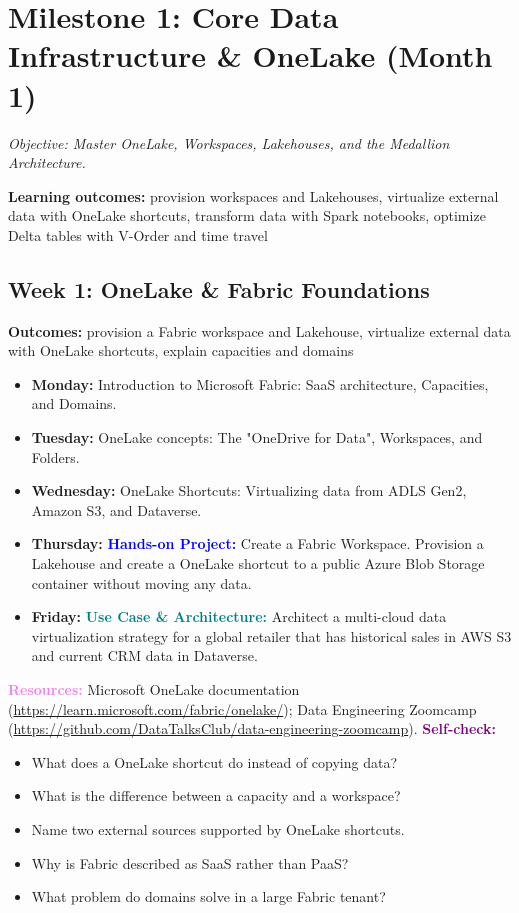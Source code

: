 \documentclass[11pt, a4paper]{article}
\newcommand{\project}[1]{\vspace{1mm}\noindent\textbf{\textcolor{blue}{Hands-on Project:}} #1}
\newcommand{\usecase}[1]{\vspace{1mm}\noindent\textbf{\textcolor{teal}{Use Case \& Architecture:}} #1}
\newcommand{\dayitem}[2]{\item \textbf{#1:} #2}
\newcommand{\resources}[1]{\vspace{1mm}\noindent\textbf{\textcolor{violet}{Resources:}} #1}
\newcommand{\selfcheck}[1]{\vspace{1mm}\noindent\textbf{\textcolor{purple}{Self-check:}} #1}
\begin{document}
\section{Milestone 1: Core Data Infrastructure \& OneLake (Month 1)}
\textit{Objective: Master OneLake, Workspaces, Lakehouses, and the Medallion Architecture.}
\par\noindent\textbf{Learning outcomes:} provision workspaces and Lakehouses, virtualize external data with OneLake shortcuts, transform data with Spark notebooks, optimize Delta tables with V-Order and time travel

\subsection*{Week 1: OneLake \& Fabric Foundations}
\par\noindent\textbf{Outcomes:} provision a Fabric workspace and Lakehouse, virtualize external data with OneLake shortcuts, explain capacities and domains
\begin{itemize}[label=-]
    \dayitem{Monday}{Introduction to Microsoft Fabric: SaaS architecture, Capacities, and Domains.}
    \dayitem{Tuesday}{OneLake concepts: The "OneDrive for Data", Workspaces, and Folders.}
    \dayitem{Wednesday}{OneLake Shortcuts: Virtualizing data from ADLS Gen2, Amazon S3, and Dataverse.}
    \dayitem{Thursday}{\project{Create a Fabric Workspace. Provision a Lakehouse and create a OneLake shortcut to a public Azure Blob Storage container without moving any data.}}
    \dayitem{Friday}{\usecase{Architect a multi-cloud data virtualization strategy for a global retailer that has historical sales in AWS S3 and current CRM data in Dataverse.}}
\end{itemize}
\resources{Microsoft OneLake documentation (\url{https://learn.microsoft.com/fabric/onelake/}); Data Engineering Zoomcamp (\url{https://github.com/DataTalksClub/data-engineering-zoomcamp}).}
\selfcheck{
\begin{itemize}[label=$\bullet$, leftmargin=6mm, itemsep=0pt]
    \item What does a OneLake shortcut do instead of copying data?
    \item What is the difference between a capacity and a workspace?
    \item Name two external sources supported by OneLake shortcuts.
    \item Why is Fabric described as SaaS rather than PaaS?
    \item What problem do domains solve in a large Fabric tenant?
\end{itemize}
}
\end{document}
